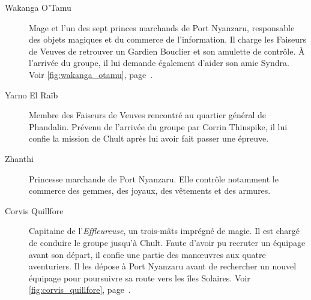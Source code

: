 \begin{description}
    \item[Wakanga O'Tamu]
    Mage et l'un des sept princes marchands de Port Nyanzaru, responsable des
    objets magiques et du commerce de l'information. Il charge les Faiseurs de
    Veuves de retrouver un Gardien Bouclier et son amulette de contrôle. À
    l'arrivée du groupe, il lui demande également d'aider son amie Syndra.
    Voir \autoref{fig:wakanga_otamu},
    page~\pageref{fig:wakanga_otamu}.

    \item[Yarno El Raïb]
    Membre des Faiseurs de Veuves rencontré au quartier général de Phandalin.
    Prévenu de l'arrivée du groupe par Corrin Thinspike, il lui confie la
    mission de Chult après lui avoir fait passer une épreuve.

    \item[Zhanthi]
    Princesse marchande de Port Nyanzaru. Elle contrôle notamment
    le commerce des gemmes, des joyaux, des vêtements et des armures.

    \item[Corvis Quillfore]
    Capitaine de l'\textit{Effleureuse}, un trois-mâts imprégné de magie. Il
    est chargé de conduire le groupe jusqu'à Chult. Faute d'avoir pu recruter
    un équipage avant son départ, il confie une partie des manœuvres aux quatre
    aventuriers. Il les dépose à Port Nyanzaru avant de rechercher un nouvel
    équipage pour poursuivre sa route vers les îles Solaires.
    Voir \autoref{fig:corvis_quillfore},
    page~\pageref{fig:corvis_quillfore}.
\end{description}
